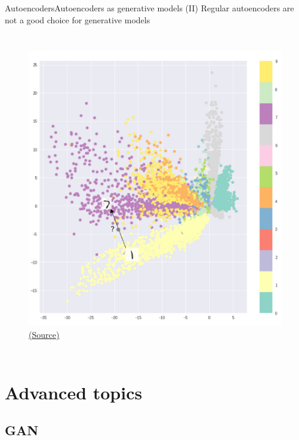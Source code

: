 \documentclass[10pt,compress]{beamer} %
\begin{document}
\begin{frame}{Autoencoders}{Autoencoders as generative models (II)}
	Regular autoencoders are not a good choice for generative models

    \begin{columns}
		\begin{figure}
	        \includegraphics[width=\textwidth]{figs/latent.png}\\
		\scriptsize\href{https://towardsdatascience.com/intuitively-understanding-variational-autoencoders-1bfe67eb5daf}{(Source)}
		\end{figure}
    \end{columns}

\end{frame}

\section{Advanced topics}

\subsection{GAN}
\end{document}
